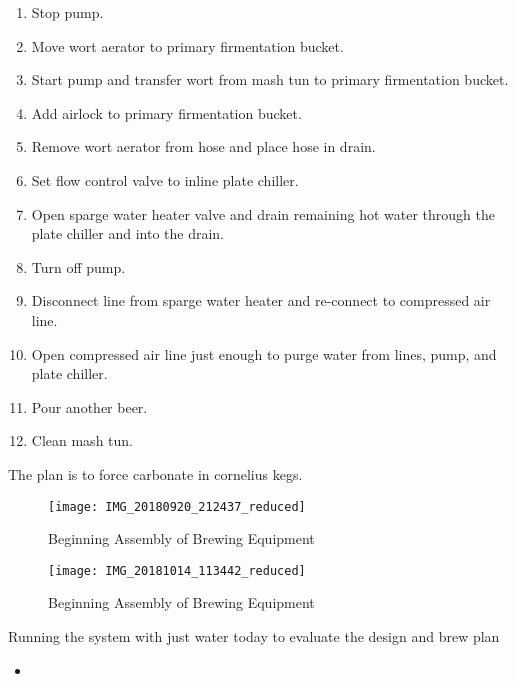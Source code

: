 \begin{enumerate}
    \item Stop pump.
    \item Move wort aerator to primary firmentation bucket.
    \item Start pump and transfer wort from mash tun to primary firmentation bucket.
    \item Add airlock to primary firmentation bucket.
    \item Remove wort aerator from hose and place hose in drain.
    \item Set flow control valve to inline plate chiller.
    \item Open sparge water heater valve and drain remaining hot water through the plate chiller and into the drain.
    \item Turn off pump.
    \item Disconnect line from sparge water heater and re-connect to compressed air line.
    \item Open compressed air line just enough to purge water from lines, pump, and plate chiller.
    \item Pour another beer.
    \item Clean mash tun.
\end{enumerate}

The plan is to force carbonate in cornelius kegs.

\begin{figure}[H]
  \centering
  \texttt{[image: IMG\_20180920\_212437\_reduced]}
  \caption{Beginning Assembly of Brewing Equipment}\label{fig:temp}
\end{figure}


\FloatBarrier{}


\begin{figure}[H]
  \centering
  \texttt{[image: IMG\_20181014\_113442\_reduced]}
  \caption{Beginning Assembly of Brewing Equipment}\label{fig:temp}
\end{figure}

Running the system with just water today to evaluate the design and brew plan 
\begin{itemize}
    \item 
\end{itemize}

